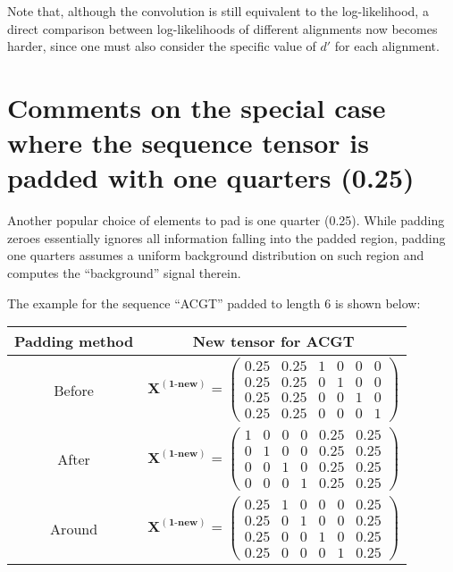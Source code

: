 \documentclass[12pt]{article}
\newcommand{\matrixSymbol}[1]{\mathbf{#1}}
\begin{document}
Note that, although the convolution is still equivalent to the log-likelihood, a direct comparison between log-likelihoods of different alignments now becomes harder, since one must also consider the specific value of $d'$ for each alignment.


\section{Comments on the special case where the sequence tensor is padded with one quarters (0.25)}

Another popular choice of elements to pad is one quarter (0.25). While padding zeroes essentially ignores all information falling into the padded region, padding one quarters assumes a uniform background distribution on such region and computes the ``background'' signal therein.

The example for the sequence ``ACGT'' padded to length 6 is shown below:

\begin{center}
\begin{tabular}{ c  c  }
  \hline
  Padding method & New tensor for ACGT \\
  \hline			
  Before & $ \matrixSymbol{X^{(1\text{-new})}} = \left( \begin{array}{cccccc} 0.25 & 0.25 & 1 & 0 & 0 & 0 \\    0.25 & 0.25 & 0 & 1 & 0 & 0 \\   0.25 & 0.25 & 0 & 0 & 1 & 0 \\   0.25 & 0.25 & 0 & 0 & 0 & 1  \end{array} \right)  $ \\
  After & $ \matrixSymbol{X^{(1\text{-new})}} = \left( \begin{array}{cccccc} 1 & 0 & 0 & 0 & 0.25 & 0.25 \\   0 & 1 & 0 & 0 & 0.25 & 0.25 \\  0 & 0 & 1 & 0 & 0.25 & 0.25 \\   0 & 0 & 0 & 1 & 0.25 & 0.25  \end{array} \right)  $ \\
  Around & $ \matrixSymbol{X^{(1\text{-new})}} = \left( \begin{array}{cccccc} 0.25 & 1 & 0 & 0 & 0 & 0.25 \\    0.25 & 0 & 1 & 0 & 0 & 0.25 \\   0.25 & 0 & 0 & 1 & 0 & 0.25 \\   0.25 & 0 & 0 & 0 & 1 & 0.25  \end{array} \right)  $ \\
  \hline  
\end{tabular}
\end{center}
\end{document}
